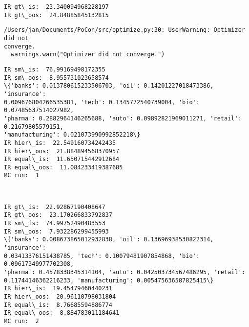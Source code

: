 \documentclass[11pt]{article}
\begin{document}
    \begin{Verbatim}[commandchars=\\\{\},fontsize=\footnotesize]
IR gt\_is:  23.340094968228197
IR gt\_oos:  24.84885845132815

    \end{Verbatim}

    \begin{Verbatim}[commandchars=\\\{\},fontsize=\footnotesize]
/Users/jan/Documents/PoCon/src/optimize.py:30: UserWarning: Optimizer did not
converge.
  warnings.warn("Optimizer did not converge.")

    \end{Verbatim}

    \begin{Verbatim}[commandchars=\\\{\},fontsize=\footnotesize]
IR sm\_is:  76.99169498172355
IR sm\_oos:  8.955731023658574
\{'banks': 0.013780615233506703, 'oil': 0.14201227018473386, 'insurance':
0.009676804266535381, 'tech': 0.1345772540739004, 'bio': 0.07485637514027982,
'pharma': 0.2882964146265688, 'auto': 0.09892821969011271, 'retail': 0.21679805579151,
'manufacturing': 0.021073990992852218\}
IR hier\_is:  22.549160734242435
IR hier\_oos:  21.884894568370957
IR equal\_is:  11.650715442912684
IR equal\_oos:  11.084233419387685
MC run:  1

    \end{Verbatim}

    \begin{center}
    \end{center}
    { \hspace*{\fill} \\}
    
    \begin{Verbatim}[commandchars=\\\{\},fontsize=\footnotesize]
IR gt\_is:  22.92867190408647
IR gt\_oos:  23.170266833792837
IR sm\_is:  74.99752490483553
IR sm\_oos:  7.932286299455993
\{'banks': 0.008673865012932838, 'oil': 0.13696938530822314, 'insurance':
0.03413376151438785, 'tech': 0.10079481907854868, 'bio': 0.09617349977702308,
'pharma': 0.4578338345314104, 'auto': 0.042503734567486295, 'retail':
0.11744146362216233, 'manufacturing': 0.005475636587825415\}
IR hier\_is:  19.45479460440231
IR hier\_oos:  20.96110798031804
IR equal\_is:  8.76685594886774
IR equal\_oos:  8.884783011184641
MC run:  2

    \end{Verbatim}
\end{document}
